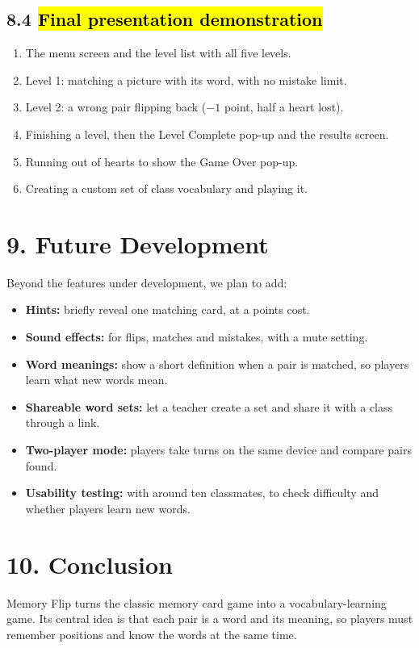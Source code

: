 \documentclass[11pt,a4paper]{article}
\begin{document}
\subsection*{8.4 \hl{Final presentation demonstration}}
\begin{enumerate}
  \item The menu screen and the level list with all five levels.
  \item Level 1: matching a picture with its word, with no mistake limit.
  \item Level 2: a wrong pair flipping back ($-1$ point, half a heart lost).
  \item Finishing a level, then the Level Complete pop-up and the results screen.
  \item Running out of hearts to show the Game Over pop-up.
  \item Creating a custom set of class vocabulary and playing it.
\end{enumerate}

\section{9. Future Development}
Beyond the features under development, we plan to add:
\begin{itemize}
  \item \textbf{Hints:} briefly reveal one matching card, at a points cost.
  \item \textbf{Sound effects:} for flips, matches and mistakes, with a mute setting.
  \item \textbf{Word meanings:} show a short definition when a pair is matched, so players learn what new words mean.
  \item \textbf{Shareable word sets:} let a teacher create a set and share it with a class through a link.
  \item \textbf{Two-player mode:} players take turns on the same device and compare pairs found.
  \item \textbf{Usability testing:} with around ten classmates, to check difficulty and whether players learn new words.
\end{itemize}

\section{10. Conclusion}
Memory Flip turns the classic memory card game into a vocabulary-learning game. Its central idea is that each pair is a word and its meaning, so players must remember positions and know the words at the same time.
\end{document}
